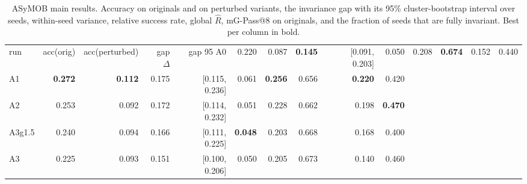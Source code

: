 \begin{table}[t]
\centering
\small
\begin{tabular}{lrrrrrrrrr}
\toprule
run & acc(orig) & acc(perturbed) & gap $\Delta$ & gap 95%
\midrule
A0 & 0.220 & 0.087 & \textbf{0.145} & [0.091, 0.203] & 0.050 & 0.208 & \textbf{0.674} & 0.152 & 0.440 \\
A1 & \textbf{0.272} & \textbf{0.112} & 0.175 & [0.115, 0.236] & 0.061 & \textbf{0.256} & 0.656 & \textbf{0.220} & 0.420 \\
A2 & 0.253 & 0.092 & 0.172 & [0.114, 0.232] & 0.051 & 0.228 & 0.662 & 0.198 & \textbf{0.470} \\
A3g1.5 & 0.240 & 0.094 & 0.166 & [0.111, 0.225] & \textbf{0.048} & 0.203 & 0.668 & 0.168 & 0.400 \\
A3 & 0.225 & 0.093 & 0.151 & [0.100, 0.206] & 0.050 & 0.205 & 0.673 & 0.140 & 0.460 \\
\bottomrule
\end{tabular}
\caption{ASyMOB main results. Accuracy on originals and on perturbed variants, the invariance gap with its 95\% cluster-bootstrap interval over seeds, within-seed variance, relative success rate, global $\hat{R}$, mG-Pass@8 on originals, and the fraction of seeds that are fully invariant. Best per column in bold.}
\label{tab:asymob_main}
\end{table}